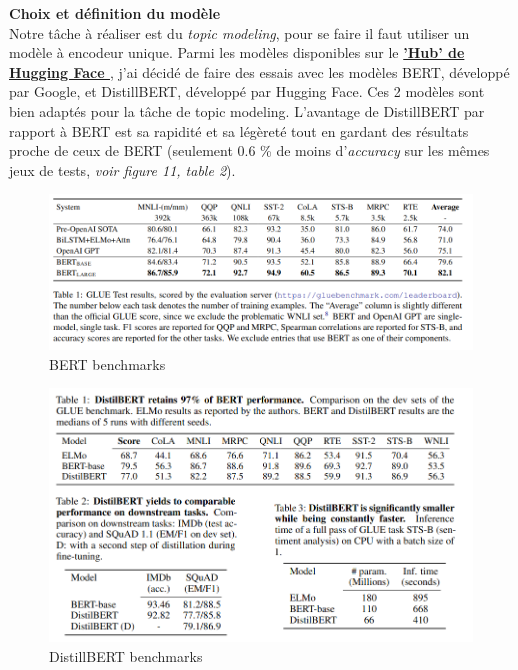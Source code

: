 \documentclass[12pt]{article}
\begin{document}
\textbf{Choix et définition du modèle} \\
Notre tâche à réaliser est du \textit{topic modeling}, pour se faire il faut utiliser un modèle à encodeur unique. 
Parmi les modèles disponibles sur le \textbf{\href{https://huggingface.co/models}{'Hub' de Hugging Face }}, j'ai décidé de faire des essais avec les modèles BERT, développé par Google, et DistillBERT, développé par Hugging Face. Ces 2 modèles sont bien adaptés pour la tâche de topic modeling. L'avantage de DistillBERT par rapport à BERT est sa rapidité et sa légèreté tout en gardant des résultats proche de ceux de BERT (seulement 0.6 \% de moins d'\textit{accuracy} sur les mêmes jeux de tests, \textit{voir figure 11, table 2}). \\

\clearpage

\begin{figure}[h]
    \centering
    \includegraphics[scale=0.45]{bench_BERT.png}
    \caption{BERT benchmarks}
    \label{fig:bench_bert}
\end{figure}


\begin{figure}[h]
    \centering
    \includegraphics[scale=0.45]{bench_distillBERT.png}
    \caption{DistillBERT benchmarks}
    \label{fig:bench_distill}
\end{figure}
\end{document}
